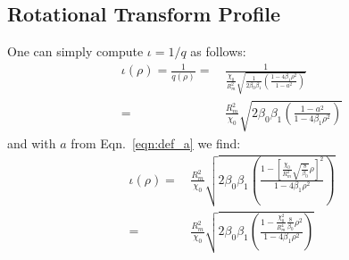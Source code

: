 \subsection{Rotational Transform Profile}
One can simply compute $\iota = 1 / q$ as follows:
\begin{align}
 \iota(\rho) = \frac{1}{q(\rho)}
 =&\, \frac{1}{
  \frac{\chi_0}{R_m^2}
 \sqrt{
   \frac{1}{2 \beta_0 \beta_1} \left( \frac{1 - 4 \beta_1 \rho^2}{1 - a^2} \right)
 }
           } \nonumber \\
 =&\,
 \frac{R_m^2}{\chi_0}
 \sqrt{2 \beta_0 \beta_1 \left( \frac{1 - a^2}{1 - 4 \beta_1 \rho^2} \right)}
\end{align}
and with $a$ from Eqn.~\ref{eqn:def_a} we find:
\begin{align}
 \iota(\rho)
 =&\, \frac{R_m^2}{\chi_0} \sqrt{2 \beta_0 \beta_1 \left( \frac{1 - \left[ \frac{\chi_0}{R_m^2} \sqrt{\frac{8}{\beta_0}} \rho \right]^2}{1 - 4 \beta_1 \rho^2} \right)} \nonumber \\
 =&\, \frac{R_m^2}{\chi_0} \sqrt{2 \beta_0 \beta_1 \left( \frac{1 - \frac{\chi_0^2}{R_m^4} \frac{8}{\beta_0} \rho^2}{1 - 4 \beta_1 \rho^2} \right)}
\end{align}


